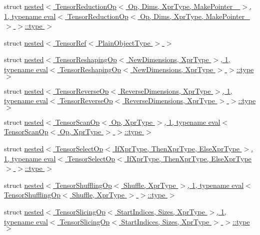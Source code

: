 \begin{DoxyCompactItemize}
\item 
struct \hyperlink{struct_eigen_1_1internal_1_1nested_3_01_tensor_reduction_op_3_01_op_00_01_dims_00_01_xpr_type_003b0e9bfd65794f3be6d0916aaf050d6d}{nested$<$ Tensor\+Reduction\+Op$<$ Op, Dims, Xpr\+Type, Make\+Pointer\+\_\+ $>$, 1, typename eval$<$ Tensor\+Reduction\+Op$<$ Op, Dims, Xpr\+Type, Make\+Pointer\+\_\+ $>$ $>$\+::type $>$}
\item 
struct \hyperlink{struct_eigen_1_1internal_1_1nested_3_01_tensor_ref_3_01_plain_object_type_01_4_01_4}{nested$<$ Tensor\+Ref$<$ Plain\+Object\+Type $>$ $>$}
\item 
struct \hyperlink{struct_eigen_1_1internal_1_1nested_3_01_tensor_reshaping_op_3_01_new_dimensions_00_01_xpr_type_0f8fc83361856d40739eb02dd0bb3ea94}{nested$<$ Tensor\+Reshaping\+Op$<$ New\+Dimensions, Xpr\+Type $>$, 1, typename eval$<$ Tensor\+Reshaping\+Op$<$ New\+Dimensions, Xpr\+Type $>$ $>$\+::type $>$}
\item 
struct \hyperlink{struct_eigen_1_1internal_1_1nested_3_01_tensor_reverse_op_3_01_reverse_dimensions_00_01_xpr_type056f008193b03fc2e20fd2a6d2e9a44a}{nested$<$ Tensor\+Reverse\+Op$<$ Reverse\+Dimensions, Xpr\+Type $>$, 1, typename eval$<$ Tensor\+Reverse\+Op$<$ Reverse\+Dimensions, Xpr\+Type $>$ $>$\+::type $>$}
\item 
struct \hyperlink{struct_eigen_1_1internal_1_1nested_3_01_tensor_scan_op_3_01_op_00_01_xpr_type_01_4_00_011_00_01t90fad9c409311154ad5faa69cdaa9691}{nested$<$ Tensor\+Scan\+Op$<$ Op, Xpr\+Type $>$, 1, typename eval$<$ Tensor\+Scan\+Op$<$ Op, Xpr\+Type $>$ $>$\+::type $>$}
\item 
struct \hyperlink{struct_eigen_1_1internal_1_1nested_3_01_tensor_select_op_3_01_if_xpr_type_00_01_then_xpr_type_0010d0192d54c3f780dbab86be6337fa47}{nested$<$ Tensor\+Select\+Op$<$ If\+Xpr\+Type, Then\+Xpr\+Type, Else\+Xpr\+Type $>$, 1, typename eval$<$ Tensor\+Select\+Op$<$ If\+Xpr\+Type, Then\+Xpr\+Type, Else\+Xpr\+Type $>$ $>$\+::type $>$}
\item 
struct \hyperlink{struct_eigen_1_1internal_1_1nested_3_01_tensor_shuffling_op_3_01_shuffle_00_01_xpr_type_01_4_00_dada54f27507131254ad9331d623790d}{nested$<$ Tensor\+Shuffling\+Op$<$ Shuffle, Xpr\+Type $>$, 1, typename eval$<$ Tensor\+Shuffling\+Op$<$ Shuffle, Xpr\+Type $>$ $>$\+::type $>$}
\item 
struct \hyperlink{struct_eigen_1_1internal_1_1nested_3_01_tensor_slicing_op_3_01_start_indices_00_01_sizes_00_01_xd420115a29e780890854e1fb453a6b2f}{nested$<$ Tensor\+Slicing\+Op$<$ Start\+Indices, Sizes, Xpr\+Type $>$, 1, typename eval$<$ Tensor\+Slicing\+Op$<$ Start\+Indices, Sizes, Xpr\+Type $>$ $>$\+::type $>$}

\end{DoxyCompactItemize}
